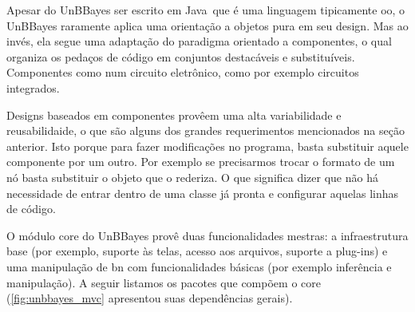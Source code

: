 Apesar do UnBBayes ser escrito em Java\texttrademark\, que é uma linguagem tipicamente \gls{oo}, o UnBBayes raramente aplica uma orientação a objetos pura em seu design. Mas ao invés, ela segue uma adaptação do paradigma orientado a componentes, o qual organiza os pedaços de código em conjuntos destacáveis e substituíveis. Componentes como num circuito eletrônico, como por exemplo circuitos integrados.

Designs baseados em componentes provêem uma alta variabilidade e reusabilidaide, o que são alguns dos grandes requerimentos mencionados na seção anterior. Isto porque para fazer modificações no programa, basta substituir aquele componente por um outro. Por exemplo se precisarmos trocar o formato de um nó basta substituir o objeto que o rederiza. O que significa dizer que não há necessidade de entrar dentro de uma classe já pronta e configurar aquelas linhas de código.

O módulo core do UnBBayes provê duas funcionalidades mestras: a infraestrutura base (por exemplo, suporte às telas, acesso aos arquivos, suporte a plug-ins) e uma manipulação de \gls{bn} com funcionalidades básicas (por exemplo inferência e manipulação). A seguir listamos os pacotes que compõem o core (\autoref{fig:unbbayes_mvc} apresentou suas dependências gerais).


